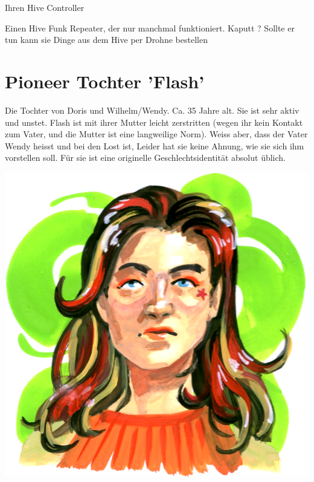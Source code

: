 \begin{npcBox}[title=Doris]
    \begin{stressSection}
    \end{stressSection}
    \begin{tabularx}{\textwidth}{ XX }
    \end{tabularx}

    \begin{consequences}
    \item {}
    \item {}
    \item {}
    \end{consequences}

    \begin{equipment}
    \item Ihren Hive Controller
    \item Einen Hive Funk Repeater, der nur manchmal funktioniert. Kaputt ? Sollte er tun kann sie Dinge aus dem Hive per Drohne bestellen
    \end{equipment}
\end{npcBox}
\newpage

\section{Pioneer Tochter 'Flash'}

Die Tochter von Doris und Wilhelm/Wendy. Ca. 35 Jahre alt. Sie ist sehr aktiv und unstet. Flash ist mit ihrer Mutter leicht zerstritten (wegen ihr kein Kontakt zum Vater, und die Mutter ist eine langweilige Norm). Weiss aber, dass der Vater Wendy heisst und bei den Lost ist, Leider hat sie keine Ahnung, wie sie sich ihm vorstellen soll. Für sie ist eine originelle Geschlechtsidentität absolut üblich.

\begin{center}
    \includegraphics[scale=0.4]{portraits/Flohmarkt_Flash.png}
\end{center}

